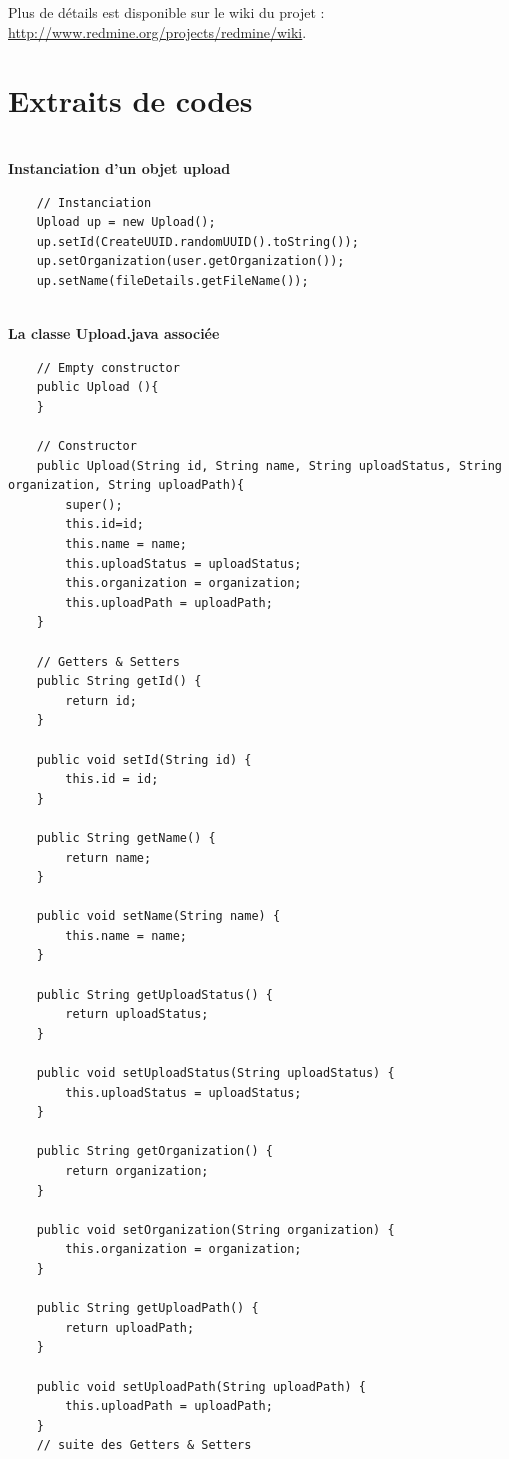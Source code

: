 Plus de détails est disponible sur le wiki du projet : \url{http://www.redmine.org/projects/redmine/wiki}.

\pagebreak

\section{Extraits de codes}\label{Annexe B}\\

\textbf{Instanciation d'un objet upload}\\
\begin{lstlisting}
	// Instanciation
	Upload up = new Upload();
	up.setId(CreateUUID.randomUUID().toString());
	up.setOrganization(user.getOrganization());
	up.setName(fileDetails.getFileName());
\end{lstlisting} \\

\textbf{La classe Upload.java associée}\\

\begin{lstlisting}
	// Empty constructor
	public Upload (){
	}

    // Constructor
    public Upload(String id, String name, String uploadStatus, String organization, String uploadPath){
        super();
        this.id=id;
        this.name = name;
        this.uploadStatus = uploadStatus;
        this.organization = organization;
        this.uploadPath = uploadPath;
    }
    
    // Getters & Setters
    public String getId() {
        return id;
    }

    public void setId(String id) {
        this.id = id;
    }
    
    public String getName() {
        return name;
    }

    public void setName(String name) {
        this.name = name;
    }

    public String getUploadStatus() {
        return uploadStatus;
    }

    public void setUploadStatus(String uploadStatus) {
        this.uploadStatus = uploadStatus;
    }

    public String getOrganization() {
        return organization;
    }

    public void setOrganization(String organization) {
        this.organization = organization;
    }

    public String getUploadPath() {
        return uploadPath;
    }

    public void setUploadPath(String uploadPath) {
        this.uploadPath = uploadPath;
    }
	// suite des Getters & Setters
\end{lstlisting} \\

